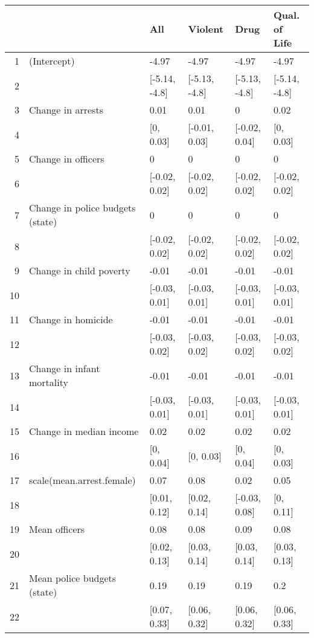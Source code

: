 \begin{table}[ht]
\centering
\begin{tabular}{rlllll}
  \hline
 &   & All & Violent & Drug & Qual. of Life \\ 
  \hline
1 & (Intercept) & -4.97 & -4.97 & -4.97 & -4.97 \\ 
  2 &  & [-5.14, -4.8] & [-5.13, -4.8] & [-5.13, -4.8] & [-5.14, -4.8] \\ 
  3 & Change in arrests & 0.01 & 0.01 & 0 & 0.02 \\ 
  4 &  & [0, 0.03] & [-0.01, 0.03] & [-0.02, 0.04] & [0, 0.03] \\ 
  5 & Change in officers & 0 & 0 & 0 & 0 \\ 
  6 &  & [-0.02, 0.02] & [-0.02, 0.02] & [-0.02, 0.02] & [-0.02, 0.02] \\ 
  7 & Change in police budgets (state) & 0 & 0 & 0 & 0 \\ 
  8 &  & [-0.02, 0.02] & [-0.02, 0.02] & [-0.02, 0.02] & [-0.02, 0.02] \\ 
  9 & Change in child poverty & -0.01 & -0.01 & -0.01 & -0.01 \\ 
  10 &  & [-0.03, 0.01] & [-0.03, 0.01] & [-0.03, 0.01] & [-0.03, 0.01] \\ 
  11 & Change in homicide & -0.01 & -0.01 & -0.01 & -0.01 \\ 
  12 &  & [-0.03, 0.02] & [-0.03, 0.02] & [-0.03, 0.02] & [-0.03, 0.02] \\ 
  13 & Change in infant mortality & -0.01 & -0.01 & -0.01 & -0.01 \\ 
  14 &  & [-0.03, 0.01] & [-0.03, 0.01] & [-0.03, 0.01] & [-0.03, 0.01] \\ 
  15 & Change in median income & 0.02 & 0.02 & 0.02 & 0.02 \\ 
  16 &  & [0, 0.04] & [0, 0.03] & [0, 0.04] & [0, 0.03] \\ 
  17 & scale(mean.arrest.female) & 0.07 & 0.08 & 0.02 & 0.05 \\ 
  18 &  & [0.01, 0.12] & [0.02, 0.14] & [-0.03, 0.08] & [0, 0.11] \\ 
  19 & Mean officers & 0.08 & 0.08 & 0.09 & 0.08 \\ 
  20 &  & [0.02, 0.13] & [0.03, 0.14] & [0.03, 0.14] & [0.03, 0.13] \\ 
  21 & Mean police budgets (state) & 0.19 & 0.19 & 0.19 & 0.2 \\ 
  22 &  & [0.07, 0.33] & [0.06, 0.32] & [0.06, 0.32] & [0.06, 0.33] \\ 

\end{tabular}
\end{table}
